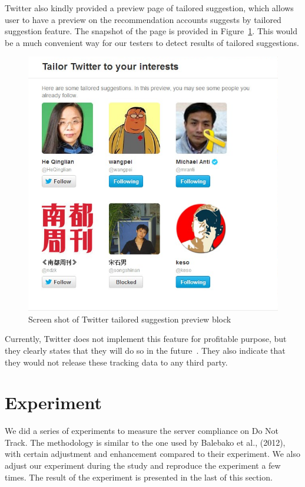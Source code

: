 \documentclass{sig-alternate}
\begin{document}
Twitter also kindly provided a preview page of tailored suggestion, which allows user to have a preview on the recommendation accounts suggests by tailored suggestion feature. The snapshot of the page is provided in Figure~\ref{fig:tailored}. This would be a much convenient way for our testers to detect results of tailored suggestions.

\begin{figure}
\begin{center}
\includegraphics[width=0.9\columnwidth]{tailored}
\end{center}
\caption{Screen shot of Twitter tailored suggestion preview block}
\label{fig:tailored}
\end{figure}


Currently, Twitter does not implement this feature for profitable purpose, but they clearly states that they will do so in the future~\cite{twitterfaq}. They also indicate that they would not release these tracking data to any third party.

\section{Experiment} \label{sec:experiment}

We did a series of experiments to measure the server compliance on Do Not Track. The methodology is similar to the one used by Balebako et al., (2012), with certain adjustment and enhancement compared to their experiment. We also adjust our experiment during the study and reproduce the experiment a few times. The result of the experiment is presented in the last of this section.
\end{document}
